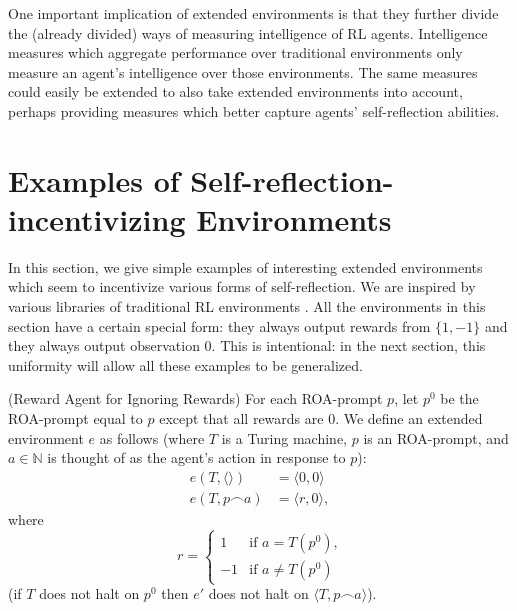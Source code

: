 \documentclass[runningheads]{llncs}
\begin{document}
One important implication of extended environments is that they further divide
the (already divided) ways of measuring intelligence of RL agents. Intelligence
measures
\cite{alexander2019intelligence} \cite{hernandez} \cite{legg2007universal}
which aggregate performance over traditional environments only measure
an agent's intelligence over those environments. The same measures could easily
be extended to also take extended environments into account, perhaps providing
measures which better capture agents' self-reflection abilities.

\section{Examples of Self-reflection-incentivizing Environments}

In this section, we give simple examples of interesting extended environments which seem
to incentivize various forms of self-reflection. We are inspired by various libraries of
traditional RL environments \cite{bellemare2013arcade}
\cite{beyret2019animal} \cite{brockman2016openai} \cite{chollet2019measure}
\cite{cobbe2020leveraging}. All the environments in this section have a certain special
form: they always output rewards from $\{1,-1\}$ and they always output observation $0$.
This is intentional: in the next section, this uniformity will allow all these examples
to be generalized.

\begin{example}
\label{rewardagentforignoringrewardsexample}
    (Reward Agent for Ignoring Rewards)
    For each ROA-prompt $p$, let $p^0$ be the ROA-prompt equal to $p$ except that
    all rewards are $0$.
    We define an extended environment $e$ as follows
    (where $T$ is a Turing machine, $p$ is an ROA-prompt, and $a\in \mathbb N$ is thought of as
    the agent's action in response to $p$):
    \begin{align*}
        e(T,\langle\rangle) &= \langle 0,0\rangle\\
        e(T,p\frown a)
        &= \langle r,0\rangle,
    \end{align*}
    where
    \[
        r =
        \begin{cases}
            1 & \mbox{if $a=T(p^0)$,}\\
            -1 & \mbox{if $a\not=T(p^0)$}
        \end{cases}
    \]
    (if $T$ does not halt on $p^0$ then $e'$ does not halt on
    $\langle T,p\frown a\rangle$).
\end{example}
\end{document}
